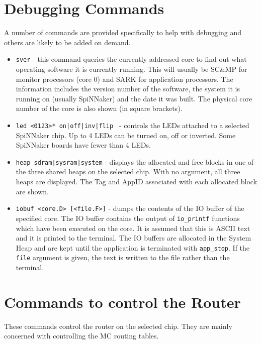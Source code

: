 \section{Debugging Commands}

A number of commands are provided specifically to help with debugging
and others are likely to be added on demand.

\begin{itemize}

\item
\texttt{sver} - this command queries the currently addressed core
to find out what operating software it is currently running. This will
usually be SC\&MP for monitor processors (core 0) and SARK for
application processors. The information includes the version number of
the software, the system it is running on (usually SpiNNaker) and the
date it was built. The physical core number of the core is also shown
(in square brackets).

\item
\texttt{led <0123>* on|off|inv|flip } - controls the LEDs attached to
a selected SpiNNaker chip. Up to 4 LEDs can be turned on, off or
inverted.  Some SpiNNaker boards have fewer than 4 LEDs.

\item
\texttt{heap sdram|sysram|system} - displays the allocated and free
blocks in one of the three shared heaps on the selected chip. With no
argument, all three heaps are displayed. The Tag and AppID associated
with each allocated block are shown.

\item
\texttt{iobuf <core.D> [<file.F>]} - dumps the contents of the IO buffer of the
specified core. The IO buffer contains the output
of \texttt{io\_printf} functions which have been executed on the
core. It is assumed that this is ASCII text and it is printed to the
terminal. The IO buffers are allocated in the System Heap and are kept
until the application is terminated with \texttt{app\_stop}. If
the \texttt{file} argument is given, the text is written to the file
rather than the terminal.

\end{itemize}

\section{Commands to control the Router}

These commands control the router on the selected chip. They are
mainly concerned with controlling the MC routing tables.

